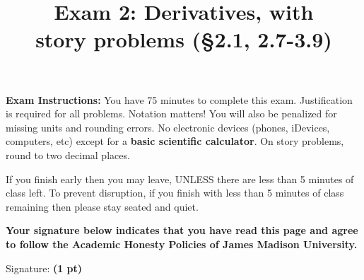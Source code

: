 \documentclass[12pt, addpoints]{exam/exam}
\title{\vspace{-8pc}
\vfill{\Huge
	\bf Exam 2: Derivatives, with \\ story problems %
	(\S2.1, 2.7-3.9)} 
	}
\date{}
\newcommand{\1}{^{-1}}
\theoremstyle{plain}
\begin{document}
\begin{coverpages}
\maketitle
\thispagestyle{headandfoot}
\vspace{-4pc}
{\bf Exam Instructions:} You have 75 minutes to complete this exam.  Justification is required for all problems.  Notation matters!  You will also be penalized for missing units and rounding errors.  
No electronic devices (phones, iDevices, computers, etc) except for a \textbf{basic scientific calculator}.  On story problems, round to two decimal places. 

\vspace{1pc}
If you finish early then you may leave, UNLESS there are less than 5 minutes of class left.  To prevent disruption, if you finish with less than 5 minutes of class remaining then please stay seated and quiet.

\begin{flushright}

\vspace{0.3in}

\vspace{0.3in}
\end{flushright}

\vfill
\textbf{Your signature below indicates that you have read this page and agree to follow the Academic Honesty Policies of James Madison University.}  

\vspace{0.3in}
Signature: {\bf (1 pt)} \underline{\hspace{73ex}}

\newpage
\vspace*{\fill}
\gradetable
\end{coverpages}
\end{document}

